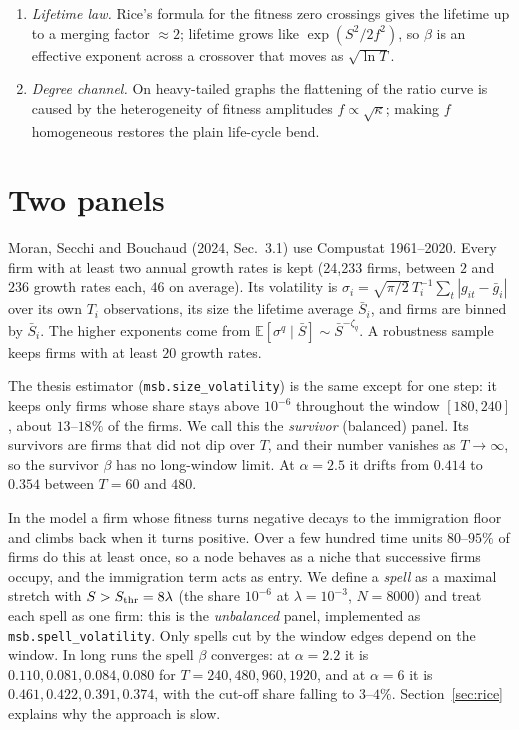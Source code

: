 \documentclass[11pt]{article}
\newcommand{\E}{\mathbb E}
\newcommand{\Sthr}{S_{\rm thr}}
\theoremstyle{remark}
\begin{document}
\begin{center}
{\begin{minipage}{0.91\textwidth}
\begin{enumerate}
        rare deep dips.  This generalises the degree criterion of the $\beta$ note.
  \item \emph{Lifetime law.} Rice's formula for the fitness zero crossings gives the lifetime up to a merging
        factor $\approx2$; lifetime grows like $\exp(S^2/2f^2)$, so $\beta$ is an effective exponent across a
        crossover that moves as $\sqrt{\ln T}$.
  \item \emph{Degree channel.} On heavy-tailed graphs the flattening of the ratio curve is caused by the
        heterogeneity of fitness amplitudes $f\propto\sqrt\kappa$; making $f$ homogeneous restores the plain
        life-cycle bend.
\end{enumerate}
\end{minipage}}
\end{center}

\section{Two panels}

Moran, Secchi and Bouchaud (2024, Sec.~3.1) use Compustat 1961--2020.  Every firm with at least two annual
growth rates is kept (24{,}233 firms, between $2$ and $236$ growth rates each, $46$ on average).  Its volatility
is $\sigma_i=\sqrt{\pi/2}\,T_i^{-1}\sum_t|g_{it}-\bar g_i|$ over its own $T_i$ observations, its size the
lifetime average $\bar S_i$, and firms are binned by $\bar S_i$.  The higher exponents come from
$\E[\sigma^q\mid\bar S]\sim\bar S^{-\zeta_q}$.  A robustness sample keeps firms with at least $20$ growth rates.

The thesis estimator (\texttt{msb.size\_volatility}) is the same except for one step: it keeps only firms whose
share stays above $10^{-6}$ throughout the window $[180,240]$, about $13$--$18\%$ of the firms.  We call this
the \emph{survivor} (balanced) panel.  Its survivors are firms that did not dip over $T$, and their number
vanishes as $T\to\infty$, so the survivor $\beta$ has no long-window limit.  At $\alpha=2.5$ it drifts from
$0.414$ to $0.354$ between $T=60$ and $480$.

In the model a firm whose fitness turns negative decays to the immigration floor and climbs back when it turns
positive.  Over a few hundred time units $80$--$95\%$ of firms do this at least once, so a node behaves as a
niche that successive firms occupy, and the immigration term acts as entry.  We define a \emph{spell} as a
maximal stretch with $S>\Sthr=8\lambda$ (the share $10^{-6}$ at $\lambda=10^{-3}$, $N=8000$) and treat each spell
as one firm: this is the \emph{unbalanced} panel, implemented as \texttt{msb.spell\_volatility}.  Only spells cut
by the window edges depend on the window.  In long runs the spell $\beta$ converges: at $\alpha=2.2$ it is
$0.110, 0.081, 0.084, 0.080$ for $T=240,480,960,1920$, and at $\alpha=6$ it is $0.461, 0.422, 0.391, 0.374$,
with the cut-off share falling to $3$--$4\%$.  Section~\ref{sec:rice} explains why the approach is slow.
\end{document}
